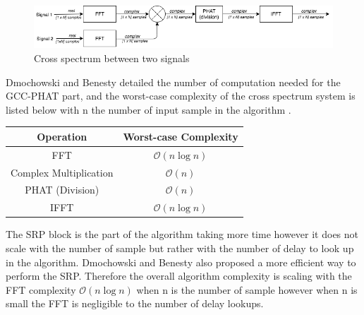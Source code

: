 \begin{figure}[H]
    \centering
    \includegraphics[width=1\textwidth]{Figures/crossspectrum3.png}
    \caption{Cross spectrum between two signals}
    \label{fig:crossspectrumsystem}
\end{figure}

Dmochowski and Benesty \cite{dmochowski2007generalized} detailed the number of computation needed for the GCC-PHAT part, and the worst-case complexity of the cross spectrum system is listed below with n the number of input sample in the algorithm . 

\begin{center}
  \begin{tabular}{ |c | c | }
    \hline
    Operation  & Worst-case Complexity \\ \hline
    FFT  & $\mathcal{O}(n\log{}n)$  \\ \hline
    Complex Multiplication  & $\mathcal{O}(n)$  \\ \hline
    PHAT (Division)  & $\mathcal{O}(n)$  \\ \hline
    IFFT  & $\mathcal{O}(n\log{}n)$  \\
    \hline
  \end{tabular}
\end{center}

The SRP block is the part of the algorithm taking more time however it does not scale with the number of sample but rather with the number of delay to look up in the algorithm. Dmochowski and Benesty \cite{dmochowski2007generalized} also proposed a more efficient way to perform the SRP. Therefore the overall algorithm complexity is scaling with the FFT complexity $\mathcal{O}(n\log{}n)$ when n is the number of sample however when n is small the FFT is negligible to the number of delay lookups. 


